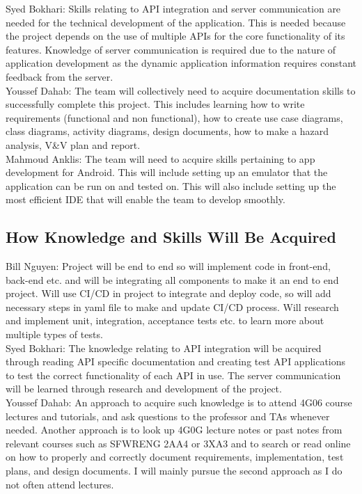 \documentclass[12pt,letterpaper]{article}
\begin{document}
\noindent Syed Bokhari: Skills relating to API integration and server communication are needed for the technical development of the application. This is needed because the project depends on the use of multiple APIs for the core functionality of its features. Knowledge of server communication is required due to the nature of application development as the dynamic application information requires constant feedback from the server. \\

\noindent Youssef Dahab: The team will collectively need to acquire documentation skills to successfully complete this project. This includes learning how to write requirements (functional and non functional), how to create use case diagrams, class diagrams, activity diagrams, design documents, how to make a hazard analysis, V\&V plan and report.\\

\noindent Mahmoud Anklis: The team will need to acquire skills pertaining to app development for Android. This will include setting up an emulator that the application can be run on and tested on. This will also include setting up the most efficient IDE that will enable the team to develop smoothly. 

\subsection{How Knowledge and Skills Will Be Acquired}

\noindent Bill Nguyen: Project will be end to end so will implement code in front-end, back-end etc. and will be integrating all components to make it an end to end project. Will use CI/CD in project to integrate and deploy code, so will add necessary steps in yaml file to make and update CI/CD process. Will research and implement unit, integration, acceptance tests etc. to learn more about multiple types of tests. \\

\noindent Syed Bokhari: The knowledge relating to API integration will be acquired through reading API specific documentation and creating test API applications to test the correct functionality of each API in use. The server communication will be learned through research and development of the project.\\

\noindent Youssef Dahab: An approach to acquire such knowledge is to attend 4G06 course lectures and tutorials, and ask questions to the professor and TAs whenever needed. Another approach is to look up 4G0G lecture notes or past notes from relevant courses such as SFWRENG 2AA4 or 3XA3 and to search or read online on how to properly and correctly document requirements, implementation, test plans, and design documents. I will mainly pursue the second approach as I do not often attend lectures.\\
\end{document}
